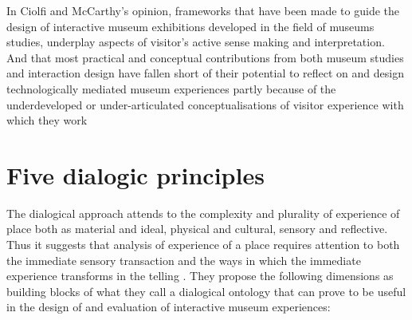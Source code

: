 In Ciolfi and McCarthy’s opinion, frameworks that have been made to guide the design of interactive museum exhibitions developed in the field of museums studies, underplay aspects of visitor’s active sense making and interpretation. And that most practical and conceptual contributions from both museum studies and interaction design have fallen short of their potential to reflect on and design technologically mediated museum experiences partly because of the underdeveloped or under-articulated conceptualisations of visitor experience with which they work \autocite[p. 248]{mccarthy_place}



\section{Five dialogic principles}
The dialogical approach attends to the complexity and plurality of experience of place both as material and ideal, physical and cultural, sensory and reflective. Thus it suggests that analysis of experience of a place requires attention to both the immediate sensory transaction and the ways in which the immediate experience transforms in the telling \autocite[p. 251]{mccarthy_place}. They propose the following dimensions as building blocks of what they call a dialogical ontology that can prove to be useful in the design of and evaluation of interactive museum experiences:

